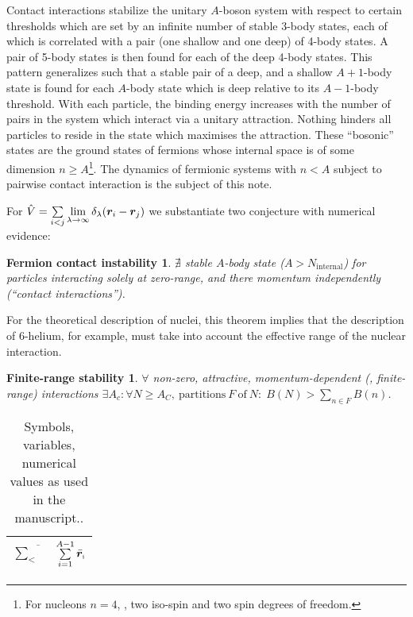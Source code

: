 \documentclass[aps,prd,onecolumn
,tightenlines,letterpaper,
notitlepage,11pt,
nofootinbib]{revtex4-1}
\begin{document}
Contact interactions stabilize the unitary $A$-boson system
with respect to certain thresholds which are set by an infinite
number of stable 3-body states, each of which is correlated with a
pair (one shallow and one deep) of 4-body states.
A pair of 5-body states is then found for each of the deep 4-body states.
This pattern generalizes such that a stable pair of a deep, and a shallow $A+1$-body state
is found for each $A$-body state which is deep relative to its $A-1$-body threshold.
With each particle, the binding energy increases with the number of pairs
in the system which interact via a unitary attraction. Nothing hinders all particles
to reside in the state which maximises the attraction.
These ``bosonic'' states are the ground states of fermions whose internal space
is of some dimension $n\geq A$\footnote{For nucleons $n=4$, \ie, two iso-spin and two spin degrees of freedom.}. The dynamics of fermionic systems with $n<A$ subject
to pairwise contact interaction is the subject of this note.

For
$\hat{V}=\sum\limits_{i<j}\lim\limits_{\lambda\to\infty}\delta_\lambda(\boldsymbol{r}_i-\boldsymbol{r}_j)$
we substantiate two conjecture with numerical evidence:

\newtheorem*{thm1}{Fermion contact instability}
\begin{thm1}
$\nexists$ stable $A$-body state ($A>N_\text{internal}$) for particles interacting
solely at zero-range, and there momentum independently (``contact interactions'').
\end{thm1}

For the theoretical description of nuclei, this theorem implies that the description of
6-helium, for example, must take into account the effective range of the nuclear interaction.

\newtheorem*{thm2}{Finite-range stability}
\begin{thm2}
$\forall$ non-zero, attractive, momentum-dependent (\ie, finite-range) interactions
$\exists A_c:\forall N\geq A_C,~\text{partitions}~F~\text{of}~N:\;B(N)>\sum\limits_{n\in F}B(n)$.
\end{thm2}
\newpage
\begin{table}
\setlength{\tabcolsep}{4pt}
\renewcommand{\arraystretch}{1.4}
\caption{\label{tab.legend}{Symbols, variables, numerical values as used in the manuscript..}}
\small\centering
\begin{tabular}{l|l}
\hline\hline
$\overline{\sum\limits_<}$ & $\sum\limits_{i=1}^{A-1}\bar{\boldsymbol{r}}_\text{\tiny i}$ \\
\hline
\end{tabular}
\end{table}
\end{document}

